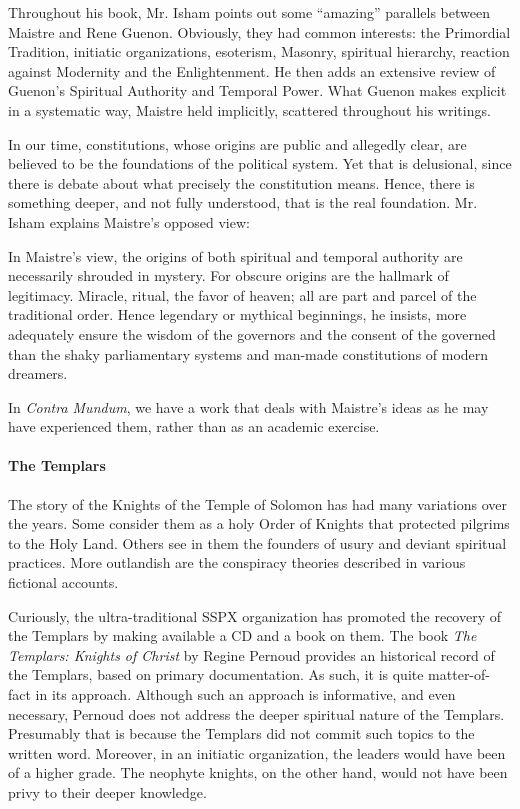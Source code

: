 Throughout his book, Mr. Isham points out some ``amazing'' parallels between Maistre and Rene Guenon. Obviously, they had common interests: the Primordial Tradition, initiatic organizations, esoterism, Masonry, spiritual hierarchy, reaction against Modernity and the Enlightenment. He then adds an extensive review of Guenon's Spiritual Authority and Temporal Power. What Guenon makes explicit in a systematic way, Maistre held implicitly, scattered throughout his writings.

In our time, constitutions, whose origins are public and allegedly clear, are believed to be the foundations of the political system. Yet that is delusional, since there is debate about what precisely the constitution means. Hence, there is something deeper, and not fully understood, that is the real foundation. Mr. Isham explains Maistre's opposed view:

\begin{quotex}
In Maistre's view, the origins of both spiritual and temporal authority are necessarily shrouded in mystery. For obscure origins are the hallmark of legitimacy. Miracle, ritual, the favor of heaven; all are part and parcel of the traditional order. Hence legendary or mythical beginnings, he insists, more adequately ensure the wisdom of the governors and the consent of the governed than the shaky parliamentary systems and man-made constitutions of modern dreamers.
\end{quotex}


In \emph{Contra Mundum}, we have a work that deals with Maistre's ideas as he may have experienced them, rather than as an academic exercise.

\paragraph{The Templars}


The story of the Knights of the Temple of Solomon has had many variations over the years. Some consider them as a holy Order of Knights that protected pilgrims to the Holy Land. Others see in them the founders of usury and deviant spiritual practices. More outlandish are the conspiracy theories described in various fictional accounts.

Curiously, the ultra-traditional SSPX organization has promoted the recovery of the Templars by making available a CD and a book on them. The book \emph{The Templars: Knights of Christ} by Regine Pernoud provides an historical record of the Templars, based on primary documentation. As such, it is quite matter-of-fact in its approach. Although such an approach is informative, and even necessary, Pernoud does not address the deeper spiritual nature of the Templars. Presumably that is because the Templars did not commit such topics to the written word. Moreover, in an initiatic organization, the leaders would have been of a higher grade. The neophyte knights, on the other hand, would not have been privy to their deeper knowledge.

